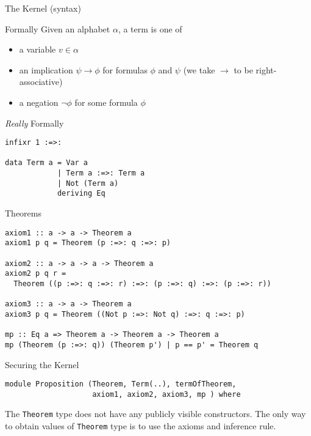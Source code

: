 \documentclass[presentation]{beamer}
\begin{document}
\begin{frame}[fragile,label={sec:orgheadline5}]{The Kernel (syntax)}
 \begin{block}{Formally}
Given an alphabet \(\alpha\), a term is one of
\begin{itemize}
\item a variable \(v \in \alpha\)
\item an implication \(\psi \rightarrow \phi\) for formulas \(\phi\) and \(\psi\) (we take \(\rightarrow\) to be
right-associative)
\item a negation \(\neg\phi\) for some formula \(\phi\)
\end{itemize}
\end{block}

\begin{block}{\emph{Really} Formally}
\begin{verbatim}
infixr 1 :=>:

data Term a = Var a
            | Term a :=>: Term a
            | Not (Term a)
            deriving Eq
\end{verbatim}
\end{block}
\end{frame}

\begin{frame}[fragile,label={sec:orgheadline6}]{Theorems}
 \small
\begin{verbatim}
axiom1 :: a -> a -> Theorem a
axiom1 p q = Theorem (p :=>: q :=>: p)

axiom2 :: a -> a -> a -> Theorem a
axiom2 p q r =
  Theorem ((p :=>: q :=>: r) :=>: (p :=>: q) :=>: (p :=>: r))

axiom3 :: a -> a -> Theorem a
axiom3 p q = Theorem ((Not p :=>: Not q) :=>: q :=>: p)

mp :: Eq a => Theorem a -> Theorem a -> Theorem a
mp (Theorem (p :=>: q)) (Theorem p') | p == p' = Theorem q
\end{verbatim}
\end{frame}

\begin{frame}[fragile,label={sec:orgheadline7}]{Securing the Kernel}
 \begin{verbatim}
module Proposition (Theorem, Term(..), termOfTheorem,
                    axiom1, axiom2, axiom3, mp ) where
\end{verbatim}

The \texttt{Theorem} type does not have any publicly visible constructors. The only way to
obtain values of \texttt{Theorem} type is to use the axioms and inference rule.
\end{frame}
\end{document}
